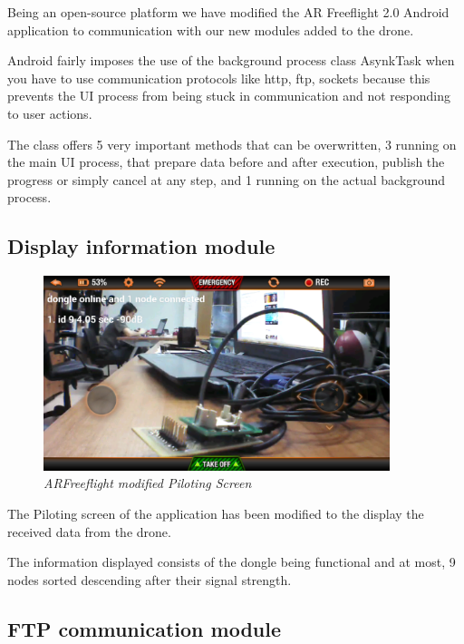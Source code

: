 Being an open-source platform we have modified the AR Freeflight 2.0 Android application to communication with our new modules added to the drone.

Android fairly imposes the use of the background process class AsynkTask when you have to use communication protocols like http, ftp, sockets because this prevents the UI process from being stuck in communication and not responding to user actions.

The class offers 5 very important methods that can be overwritten, 3 running on the main UI process, that prepare data before and after execution, publish the progress or simply cancel at any step, and 1 running on the actual background process.


\subsection{Display information module}

\begin{figure}[ht]
\begin{center}
\includegraphics[width=0.9\textwidth]{implementation/android_info.png}
\end{center}
\caption{\small \itshape{ARFreeflight modified Piloting Screen}}
\end{figure}

The Piloting screen of the application has been modified to the display the received data from the drone.

The information displayed consists of the dongle being functional and at most, 9 nodes sorted descending after their signal strength.

\subsection{FTP communication module}

